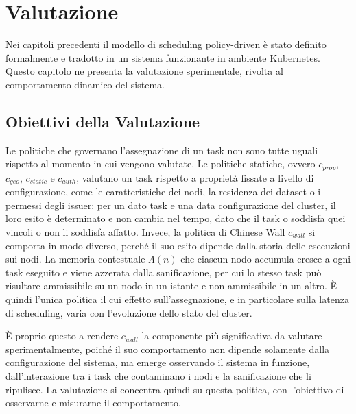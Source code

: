\chapter{Valutazione}
\label{cap:valutazione}

Nei capitoli precedenti il modello di scheduling policy-driven è stato definito formalmente e tradotto in un sistema funzionante in ambiente Kubernetes. Questo capitolo ne presenta la valutazione sperimentale, rivolta al comportamento dinamico del sistema.


\section{Obiettivi della Valutazione}
\label{sec:obiettivi_valutazione}

Le politiche che governano l'assegnazione di un task non sono tutte uguali rispetto al momento in cui vengono valutate. Le politiche statiche, ovvero $c_{prop}$, $c_{geo}$, $c_{static}$ e $c_{auth}$, valutano un task rispetto a proprietà fissate a livello di configurazione, come le caratteristiche dei nodi, la residenza dei dataset o i permessi degli issuer: per un dato task e una data configurazione del cluster, il loro esito è determinato e non cambia nel tempo, dato che il task o soddisfa quei vincoli o non li soddisfa affatto. Invece, la politica di Chinese Wall $c_{wall}$ si comporta in modo diverso, perché il suo esito dipende dalla storia delle esecuzioni sui nodi. La memoria contestuale $\Lambda(n)$ che ciascun nodo accumula cresce a ogni task eseguito e viene azzerata dalla sanificazione, per cui lo stesso task può risultare ammissibile su un nodo in un istante e non ammissibile in un altro. È quindi l'unica politica il cui effetto sull'assegnazione, e in particolare sulla latenza di scheduling, varia con l'evoluzione dello stato del cluster.

È proprio questo a rendere $c_{wall}$ la componente più significativa da valutare sperimentalmente, poiché il suo comportamento non dipende solamente dalla configurazione del sistema, ma emerge osservando il sistema in funzione, dall'interazione tra i task che contaminano i nodi e la sanificazione che li ripulisce. La valutazione si concentra quindi su questa politica, con l'obiettivo di osservarne e misurarne il comportamento.



